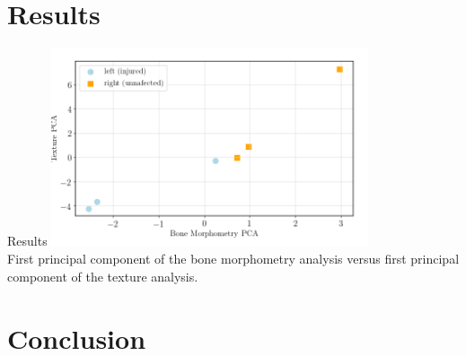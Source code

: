 \documentclass[10pt,aspectratio=169]{beamer}
\begin{document}
{
\section{Results}
\begin{frame}{Results}
  \centering
  \includegraphics[width=0.7\textwidth]{./figures/features_pcaBoneVSpcaTexture1000Bins.png}\\
  \vspace{0.1cm}
  First principal component of the bone morphometry analysis versus first principal component of the texture analysis.
\end{frame}
}

\section{Conclusion}
\end{document}
